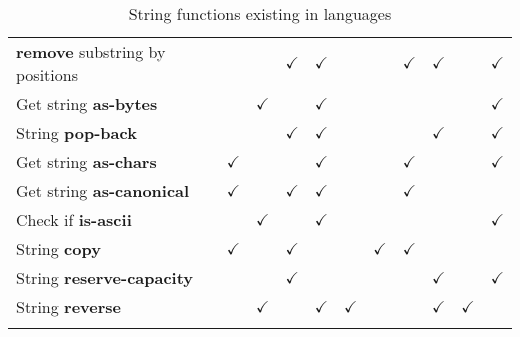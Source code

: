 \documentclass[anonymous,sigplan,review,11pt,nonacm,natbib=false]{acmart}
\begin{document}
\begin{table*}
\begin{tabular}{lllllllllll}
            \textbf{remove} substring by positions & & & $\checkmark$ & $\checkmark$ & & & $\checkmark$ & $\checkmark$ & & $\checkmark$ \\
            Get string \textbf{as-bytes} & & $\checkmark$ & & $\checkmark$ & & & & & & $\checkmark$ \\
            String \textbf{pop-back} & & & $\checkmark$ & $\checkmark$ & & & & $\checkmark$ & & $\checkmark$ \\
            Get string \textbf{as-chars} & $\checkmark$ & & & $\checkmark$ & & & $\checkmark$ & & & $\checkmark$ \\
            Get string \textbf{as-canonical} & $\checkmark$ & & $\checkmark$ & $\checkmark$ & & & $\checkmark$ & & & \\
            Check if \textbf{is-ascii} & & $\checkmark$ & & $\checkmark$ & & & & & & $\checkmark$ \\
            String \textbf{copy} & $\checkmark$ & & $\checkmark$ & & & $\checkmark$ & $\checkmark$ & & & \\
            String \textbf{reserve-capacity} & & & $\checkmark$ & & & & & $\checkmark$ & & $\checkmark$ \\
            String \textbf{reverse} & & $\checkmark$ & & $\checkmark$ & $\checkmark$ & & & $\checkmark$ & $\checkmark$ & \\
            \\ \hline
        \end{tabular}
        \caption{String functions existing in languages}
        \label{tab:my_label}
    \end{table*}


    \printbibliography
\end{document}
